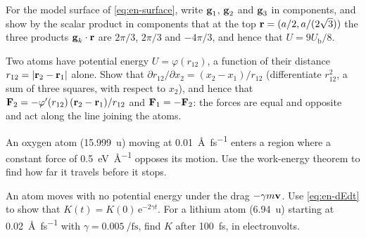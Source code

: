 \begin{exercise}
\label{ex:en-top}
For the model surface of \cref{eq:en-surface}, write $\bm{\mathrm{g}}_1$,
$\bm{\mathrm{g}}_2$ and $\bm{\mathrm{g}}_3$ in components, and show by the scalar product in
components that at the top $\bm{\mathrm{r}} = (a/2, a/(2\sqrt3))$ the three
products $\bm{\mathrm{g}}_k\cdot\bm{\mathrm{r}}$ are $2\pi/3$, $2\pi/3$ and $-4\pi/3$, and
hence that $U = 9U_{\mathrm b}/8$.
\end{exercise}

\begin{exercise}
\label{ex:en-pair}
Two atoms have potential energy $U = \varphi(r_{12})$, a function of their
distance $r_{12} = \lvert\bm{\mathrm{r}}_2 - \bm{\mathrm{r}}_1\rvert$ alone. Show that
$\partial r_{12}/\partial x_2 = (x_2 - x_1)/r_{12}$ (differentiate
$r_{12}^2$, a sum of three squares, with respect to $x_2$), and hence
that
$\bm{\mathrm{F}}_2 = -\varphi'(r_{12})\,(\bm{\mathrm{r}}_2 - \bm{\mathrm{r}}_1)/r_{12}$ and
$\bm{\mathrm{F}}_1 = -\bm{\mathrm{F}}_2$: the forces are equal and opposite and act along
the line joining the atoms.
\end{exercise}

\begin{exercise}
\label{ex:en-oxygen}
An oxygen atom (\SI{15.999}{\amu}) moving at
\SI{0.01}{\angstrom\per\femto\second} enters a region where a constant
force of \SI{0.5}{\electronvolt\per\angstrom} opposes its motion. Use the
work-energy theorem to find how far it travels before it stops.
\end{exercise}

\begin{exercise}
\label{ex:en-drag}
An atom moves with no potential energy under the drag $-\gamma m\bm{\mathrm{v}}$.
Use \cref{eq:en-dEdt} to show that $K(t) = K(0)\,\mathrm{e}^{-2\gamma t}$.
For a lithium atom (\SI{6.94}{\amu}) starting at
\SI{0.02}{\angstrom\per\femto\second} with $\gamma =
\SI{0.005}{\per\femto\second}$, find $K$ after \SI{100}{\femto\second},
in electronvolts.
\end{exercise}
